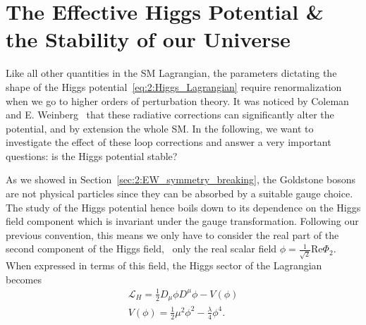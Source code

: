 
\chapter{The Effective Higgs Potential \& the Stability of our Universe} \label{chap:3:effective_higgs_potential}

Like all other quantities in the \acs{SM} Lagrangian, the parameters dictating the shape of the Higgs potential~\eqref{eq:2:Higgs_Lagrangian} require renormalization when we go to higher orders of perturbation theory. It was noticed by Coleman and E. Weinberg~\cite{Coleman:1973jx} that these radiative corrections can significantly alter the potential, and by extension the whole \acs{SM}. In the following, we want to investigate the effect of these loop corrections and answer a very important questions: is the Higgs potential stable?

As we showed in Section~\ref{sec:2:EW_symmetry_breaking}, the Goldstone bosons are not physical particles since they can be absorbed by a suitable gauge choice. The study of the Higgs potential hence boils down to its dependence on the Higgs field component which is invariant under the gauge transformation. Following our previous convention, this means we only have to consider the real part of the second component of the Higgs field, \ie\ only the real scalar field $\phi = \frac{1}{\sqrt{2}} \text{Re} \Phi_2$. When expressed in terms of this field, the Higgs sector of the Lagrangian becomes
\begin{equation}
\begin{gathered}
\mathcal{L}_H = \frac{1}{2} D_\mu \phi D^\mu \phi - V(\phi) \\
V(\phi) =  \frac{1}{2} \mu^2 \phi^2 - \frac{\lambda}{4} \phi^4.
\end{gathered}
\label{eq:3:Lagrangian_phi}
\end{equation}


